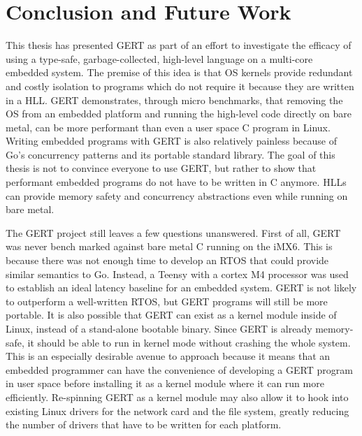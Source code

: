 \chapter{Conclusion and Future Work}

This thesis has presented GERT as part of an effort to investigate the efficacy of using
a type-safe, garbage-collected, high-level language on a multi-core embedded system. The premise
of this idea is that OS kernels provide redundant and costly isolation to programs which
do not require it because they are written in a HLL. GERT demonstrates, through micro benchmarks,
that removing the OS
from an embedded platform and running the high-level code directly on bare metal, can be
more performant than even a user space C program in Linux. Writing embedded programs with GERT
is also relatively painless because of Go's concurrency patterns and its portable standard library.
The goal of this thesis is not to convince everyone to use GERT, but rather to show that performant
embedded programs do not have to be written in C anymore. HLLs can provide memory safety and concurrency abstractions
even while running on bare metal.

The GERT project still leaves a few questions unanswered. First of all, GERT was
never bench marked against bare metal C running on the iMX6. This is because there was not enough time to develop an
RTOS that could provide similar semantics to Go. Instead, a Teensy with a cortex M4 processor was used
to establish an ideal latency baseline for an embedded system. GERT is not likely to outperform a well-written
RTOS, but GERT programs will still be more portable. It is also possible that GERT can exist as
a kernel module inside of Linux, instead of a stand-alone bootable binary. Since GERT is already
memory-safe, it should be able to run in kernel mode without crashing the whole system. This is
an especially desirable avenue to approach because it means that an embedded programmer can have
the convenience of developing a GERT program in user space before installing it as a kernel
module where it can run more efficiently. Re-spinning GERT as a kernel module may also
allow it to hook into existing Linux drivers for the network card and the file system, greatly reducing
the number of drivers that have to be written for each platform.
